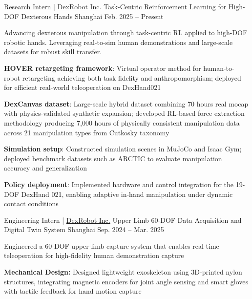 
\vspace{-8mm}

\begin{cventries}
    \cventry
      {Research Intern | \href{https://dex-robot.com}{DexRobot Inc.}} %
      {Task-Centric Reinforcement Learning for High-DOF Dexterous Hands} %
      {Shanghai} %
      {Feb. 2025 -- Present} %
      {
        Advancing dexterous manipulation through task-centric RL applied to high-DOF robotic hands. Leveraging real-to-sim human demonstrations and large-scale datasets for robust skill transfer.
        \begin{cvitems}
          \item{\textbf{HOVER retargeting framework}: Virtual operator method for human-to-robot retargeting achieving both task fidelity and anthropomorphism; deployed for efficient real-world teleoperation on DexHand021}
          \item{\textbf{DexCanvas dataset}: Large-scale hybrid dataset combining 70 hours real mocap with physics-validated synthetic expansion; developed RL-based force extraction methodology producing 7,000 hours of physically consistent manipulation data across 21 manipulation types from Cutkosky taxonomy}
          \item{\textbf{Simulation setup}: Constructed simulation scenes in MuJoCo and Isaac Gym; deployed benchmark datasets such as ARCTIC to evaluate manipulation accuracy and generalization}
          \item{\textbf{Policy deployment}: Implemented hardware and control integration for the 19-DOF DexHand 021, enabling adaptive in-hand manipulation under dynamic contact conditions}
        \end{cvitems}
      }
  \cventry
    {Engineering Intern | \href{https://dex-robot.com}{DexRobot Inc.}} %
    {Upper Limb 60-DOF Data Acquisition and Digital Twin System} %
    {Shanghai} %
    {Sep. 2024 -- Mar. 2025} %
    {
      Engineered a 60-DOF upper-limb capture system that enables real-time teleoperation for high-fidelity human demonstration capture
      \begin{cvitems}
        \item{\textbf{Mechanical Design:} Designed lightweight exoskeleton using 3D-printed nylon structures, integrating magnetic encoders for joint angle sensing and smart gloves with tactile feedback for hand motion capture}

\end{cvitems}}
\end{cventries}
